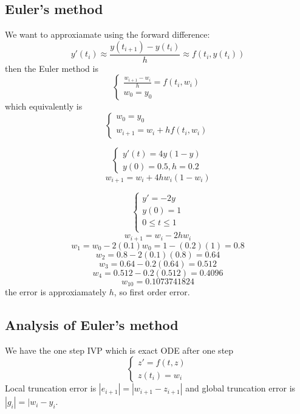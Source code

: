 \documentclass[11pt]{article}
\begin{document}
\subsection{Euler's method}
We want to approxiamate using the forward difference:
\[
    y'(t_i) \approx \frac{y(t_{i+1})-y(t_i)}{h} \approx f(t_i,y(t_i))
\]
then the Euler method is
\[
    \begin{cases}
        \frac{w_{i+1}-w_i}{h}=f(t_i,w_i) \\
         w_0=y_0
    \end{cases}
\]
which equivalently is
\[
    \begin{cases}    
w_0=y_0\\
w_{i+1} = w_i + hf(t_i,w_i)
    \end{cases}
\]
\begin{example}
    \[
    \begin{cases}
        y'(t) = 4y(1-y) \\
         y(0) = 0.5, h = 0.2
    \end{cases}
    \]
    \[
        w_{i+1} = w_i + 4hw_i(1-w_i)
    \]
    
\end{example}

\begin{example}
    \[
        \begin{cases}
            y'=-2y \\
            y(0)=1\\
            0 \le t \le 1 \\
        \end{cases}
    \]
    \[
        w_{i+1} = w_i -2h w_i
    \]
    \[
        w_1 = w_0 - 2(0.1)w_0 = 1-(0.2)(1) = 0.8
    \]
    \[
        w_2 = 0.8-2(0.1)(0.8) = 0.64 
    \]
    \[
        w_3 = 0.64-0.2(0.64) = 0.512
    \]
    \[
        w_4 = 0.512 - 0.2(0.512) = 0.4096 
    \]
    \[
        w_{10} = 0.1073741824
    \]
    the error is approxiamately $h$, so first order error.
    
\end{example}

\subsection{Analysis of Euler's method}
We have the one step IVP which is exact ODE after one step
\[
    \begin{cases}
        z'=f(t,z) \\
        z(t_i) = w_i
    \end{cases}
\]
Local truncation error is $|e_{i+1}| = |w_{i+1}-z_{i+1}|$ and global truncation error is $|g_i| = |w_i-y_i$.
\end{document}

